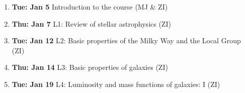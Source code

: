 \documentclass[10pt]{article}
\begin{document}
\vskip 0.2in
\begin{enumerate}
  \item {\bf Tue: Jan 5}   Introduction to the course  (MJ \& ZI) 
  \item {\bf Thu: Jan 7}     L1: Review of stellar astrophysics (ZI)

  \item {\bf Tue: Jan 12}    L2: Basic properties of the Milky Way and the Local Group (ZI)
  \item {\bf Thu: Jan 14}    L3: Basic properties of galaxies (ZI)

  \item {\bf Tue: Jan 19}    L4: Luminosity and mass functions of galaxies: I (ZI)


\end{enumerate}
\end{document}
